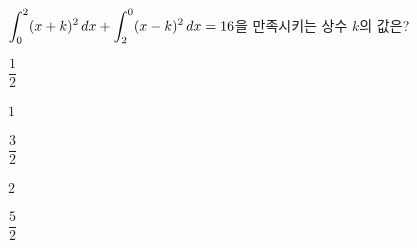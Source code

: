 $\displaystyle\int_{0}^{2}(x+k)^2\mkern3mu dx+\int_{2}^{0}(x-k)^2\mkern3mu dx=16$을 만족시키는 상수 $k$의 값은?
\begin{choices32}{\rule[-3ex]{0pt}{8ex}$\dfrac{1}{2}$}{\rule[-3ex]{0pt}{8ex}$1$}{\rule[-3ex]{0pt}{8ex}$\dfrac{3}{2}$}{\rule[-3ex]{0pt}{8ex}$2$}{\rule[-3ex]{0pt}{8ex}$\dfrac{5}{2}$}\end{choices32}
